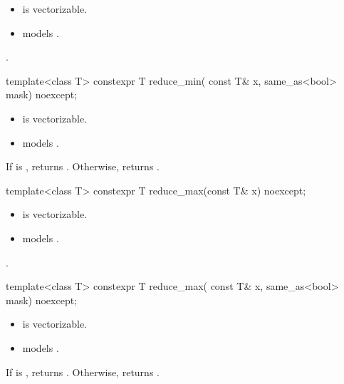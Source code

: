 \begin{itemdescr}
  \pnum\constraints
  \begin{itemize}
    \item {} is vectorizable.

    \item {} models .
  \end{itemize}

  \pnum\returns {}.
\end{itemdescr}

\begin{itemdecl}
template<class T>
  constexpr T reduce_min(
    const T& x, same_as<bool> mask) noexcept;
\end{itemdecl}

\begin{itemdescr}
  \pnum\constraints
  \begin{itemize}
    \item {} is vectorizable.

    \item {} models .
  \end{itemize}

  \pnum\returns
  If  is , returns .
  Otherwise, returns .
\end{itemdescr}

\begin{itemdecl}
template<class T> constexpr T reduce_max(const T& x) noexcept;
\end{itemdecl}

\begin{itemdescr}
  \pnum\constraints
  \begin{itemize}
    \item {} is vectorizable.

    \item {} models .
  \end{itemize}

  \pnum\returns {}.
\end{itemdescr}

\begin{itemdecl}
template<class T>
  constexpr T reduce_max(
    const T& x, same_as<bool> mask) noexcept;
\end{itemdecl}

\begin{itemdescr}
  \pnum\constraints
  \begin{itemize}
    \item {} is vectorizable.

    \item {} models .
  \end{itemize}

  \pnum\returns
  If  is , returns .
  Otherwise, returns .
\end{itemdescr}

